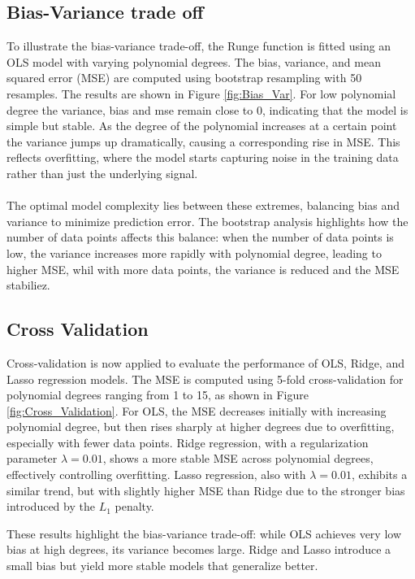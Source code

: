 \documentclass[
 reprint,            %
 amsmath,amssymb,
 aps,
]{revtex4-2}
\begin{document}
\subsection{Bias-Variance trade off}
\label{Bias-Variance trade off}
To illustrate the bias-variance trade-off, the Runge function is fitted using an OLS model with varying polynomial degrees. 
The bias, variance, and mean squared error (MSE) are computed using bootstrap resampling with 50 resamples. The results are shown in Figure \ref{fig:Bias_Var}.
For low polynomial degree the variance, bias and mse remain close to 0, indicating that the model is simple but stable.
As the degree of the polynomial increases at a certain point the variance jumps up dramatically, causing a corresponding rise in MSE.
This reflects overfitting, where the model starts capturing noise in the training data rather than just the underlying signal.\\\\
The optimal model complexity lies between these extremes, balancing bias and variance to minimize prediction error.
The bootstrap analysis highlights how the number of data points affects this balance: when the number of data points is low, the variance increases more rapidly with polynomial degree, leading to higher MSE, whil with more data points, the variance is reduced and the MSE stabiliez.\\


\subsection{Cross Validation}
\label{Cross Validation}
Cross-validation is now applied to evaluate the performance of OLS, Ridge, and Lasso regression models.
The MSE is computed using 5-fold cross-validation for polynomial degrees ranging from 1 to 15, as shown in Figure \ref{fig:Cross_Validation}.
For OLS, the MSE decreases initially with increasing polynomial degree, but then rises sharply at higher degrees due to overfitting, especially with fewer data points.
Ridge regression, with a regularization parameter $\lambda = 0.01$, shows a more stable MSE across polynomial degrees, effectively controlling overfitting.
Lasso regression, also with $\lambda = 0.01$, exhibits a similar trend, but with slightly higher MSE than Ridge due to the stronger bias introduced by the $L_1$ penalty.       

These results highlight the bias-variance trade-off: while OLS achieves very low bias at high degrees, its variance becomes large.
Ridge and Lasso introduce a small bias but yield more stable models that generalize better.

\end{document}
